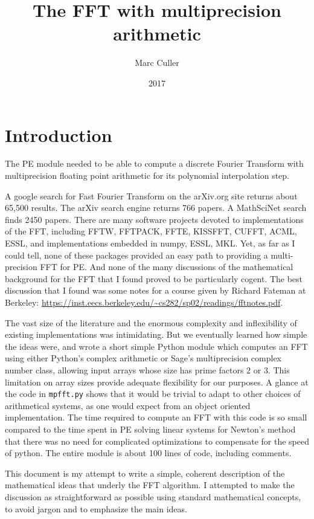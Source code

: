 \documentclass[12pt, letter, oneside]{amsart}
\theoremstyle{definition}
\theoremstyle{plain}
\numberwithin{equation}{para}
\numberwithin{figure}{section}
\begin{document}
\title{The FFT with multiprecision arithmetic}
\author{Marc Culler}
\date{2017}
\maketitle
\section{Introduction}

The PE module needed to be able to compute a discrete Fourier Transform with
multiprecision floating point arithmetic for its polynomial interpolation step.

A google search for Fast Fourier Transform on the arXiv.org site returns about
65,500 results.  The arXiv search engine returns 766 papers. A MathSciNet search
finds 2450 papers.  There are many software projects devoted to implementations
of the FFT, including FFTW, FFTPACK, FFTE, KISSFFT, CUFFT, ACML, ESSL, and
implementations embedded in numpy, ESSL, MKL.  Yet, as far as I could tell, none
of these packages provided an easy path to providing a multi-precision FFT for
PE.  And none of the many discussions of the mathematical background for the FFT
that I found proved to be particularly cogent.  The best discussion that I found
was some notes for a course given by Richard Fateman at
Berkeley:\break
\url{https://inst.eecs.berkeley.edu/~cs282/sp02/readings/fftnotes.pdf}.

The vast size of the literature and the enormous complexity and inflexibility of
existing implementations was intimidating.  But we eventually learned how simple
the ideas were, and wrote a short simple Python module which computes an FFT
using either Python's complex arithmetic or Sage's multiprecision complex number
class, allowing input arrays whose size has prime factors $2$ or $3$.  This
limitation on array sizes provide adequate flexibility for our purposes.  A
glance at the code in {\tt mpfft.py} shows that it would be trivial to adapt to
other choices of arithmetical systems, as one would expect from an object
oriented implementation.  The time required to compute an FFT with this code is
so small compared to the time spent in PE solving linear systems for Newton's
method that there was no need for complicated optimizations to compensate for
the speed of python.  The entire module is about 100 lines of code, including
comments.

This document is my attempt to write a simple, coherent description of the
mathematical ideas that underly the FFT algorithm.  I attempted to make the
discussion as straightforward as possible using standard mathematical
concepts, to avoid jargon and to emphasize the main ideas.
\end{document}
